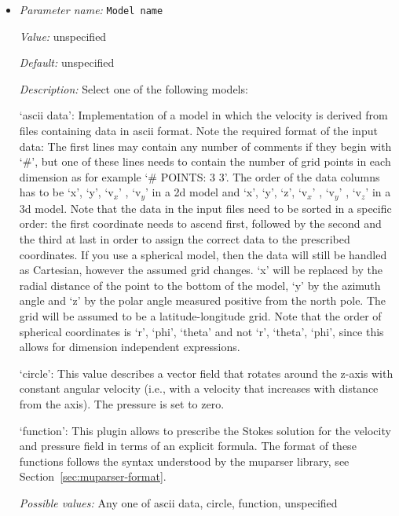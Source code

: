 \begin{itemize}
\item {\it Parameter name:} {\tt Model name}
\label{parameters:Prescribed Stokes solution/Model name}


{\it Value:} unspecified


{\it Default:} unspecified


{\it Description:} Select one of the following models:

`ascii data': Implementation of a model in which the velocity is derived from files containing data in ascii format. Note the required format of the input data: The first lines may contain any number of comments if they begin with `\#', but one of these lines needs to contain the number of grid points in each dimension as for example `\# POINTS: 3 3'. The order of the data columns has to be `x', `y', `v${}_x$' , `v${}_y$' in a 2d model and  `x', `y', `z', `v${}_x$' , `v${}_y$' , `v${}_z$' in a 3d model. Note that the data in the input files need to be sorted in a specific order: the first coordinate needs to ascend first, followed by the second and the third at last in order to assign the correct data to the prescribed coordinates. If you use a spherical model, then the data will still be handled as Cartesian, however the assumed grid changes. `x' will be replaced by the radial distance of the point to the bottom of the model, `y' by the azimuth angle and `z' by the polar angle measured positive from the north pole. The grid will be assumed to be a latitude-longitude grid. Note that the order of spherical coordinates is `r', `phi', `theta' and not `r', `theta', `phi', since this allows for dimension independent expressions.

`circle': This value describes a vector field that rotates around the z-axis with constant angular velocity (i.e., with a velocity that increases with distance from the axis). The pressure is set to zero.

`function': This plugin allows to prescribe the Stokes solution for the velocity and pressure field in terms of an explicit formula. The format of these functions follows the syntax understood by the muparser library, see Section~\ref{sec:muparser-format}.


{\it Possible values:} Any one of ascii data, circle, function, unspecified
\end{itemize}



